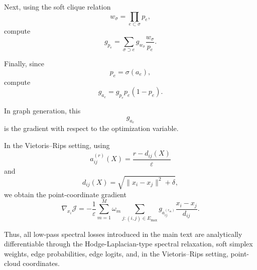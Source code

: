 \documentclass[pdflatex,sn-mathphys-ay]{sn-jnl}%
\theoremstyle{thmstyleone}%
\theoremstyle{thmstyletwo}%
\theoremstyle{thmstylethree}%
\begin{document}
\begin{appendices}
Next, using the soft clique relation
\[
w_\sigma
=
\prod_{e\subset\sigma}p_e,
\]
compute
\[
g_{p_e}
=
\sum_{\sigma\supset e}
g_{w_\sigma}
\frac{w_\sigma}{p_e}.
\]

Finally, since
\[
p_e=\sigma(a_e),
\]
compute
\[
g_{a_e}
=
g_{p_e}p_e(1-p_e).
\]

In graph generation, this
\[
g_{a_e}
\]
is the gradient with respect to the optimization variable.

In the Vietoris--Rips setting, using
\[
a_{ij}^{(r)}(X)
=
\frac{r-d_{ij}(X)}{\varepsilon}
\]
and
\[
d_{ij}(X)
=
\sqrt{
\|x_i-x_j\|^2+\delta
},
\]
we obtain the point-coordinate gradient
\[
\nabla_{x_i}\mathcal{J}
=
-\frac{1}{\varepsilon}
\sum_{m=1}^{M}
\omega_m
\sum_{j:(i,j)\in E_{\max}}
g_{a_{ij}^{(r_m)}}
\frac{x_i-x_j}{d_{ij}}.
\]

Thus, all low-pass spectral losses introduced in the main text are analytically differentiable through the Hodge-Laplacian-type spectral relaxation, soft simplex weights, edge probabilities, edge logits, and, in the Vietoris--Rips setting, point-cloud coordinates.




\end{appendices}


\end{document}
